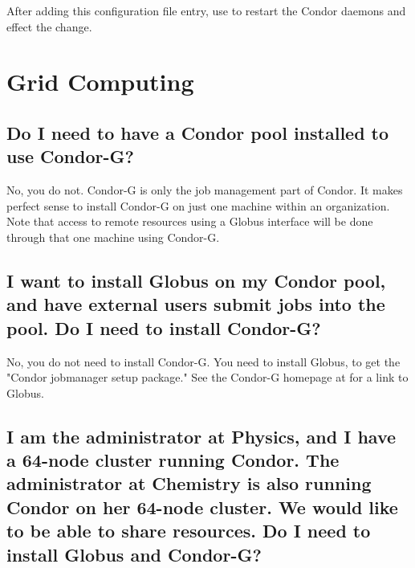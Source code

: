 After adding this configuration file entry, use 
to restart the Condor daemons and effect the change.

%

\section{Grid Computing}


\subsection*{Do I need to have a Condor pool installed to use Condor-G?}
No, you do not.
Condor-G is only the job management part of Condor.
It makes perfect sense to install Condor-G on just one machine
within an organization.
Note that access to remote resources using a Globus interface
will be done through that one machine using Condor-G.

\subsection*{I want to install Globus on my Condor pool, and have external users submit jobs into the pool. Do I need to install Condor-G?}

No, you do not need to install Condor-G.
You need to install Globus,
to get the "Condor jobmanager setup package."
See the Condor-G
homepage at 
for a link to Globus.

\subsection*{I am the administrator at Physics, and I have a 64-node cluster
running Condor.
The administrator at Chemistry is also running Condor on her 64-node cluster.
We would like to be able to share resources.
Do I need to install Globus and Condor-G?}

